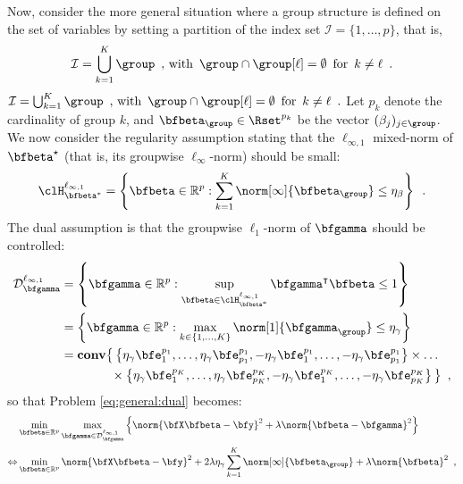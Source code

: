 Now, consider the more general situation where a group structure is defined on
the set of variables by setting a partition of the index set
$\mathcal{I}=\{1,\ldots,p\}$, that is,
\iflong
\begin{equation*}
  \mathcal{I}=\bigcup_{k=1}^K\group \enspace,\, \text{with}\enspace 
  \group \cap \group[\ell]=\emptyset \enspace
  \text{for}\enspace k\neq\ell \enspace.
\end{equation*}
\else
$
  \mathcal{I}=\bigcup_{k=1}^K\group \enspace,\, \text{with}\enspace 
  \group \cap \group[\ell]=\emptyset \enspace
  \text{for}\enspace k\neq\ell \enspace.
$
\fi
Let $p_k$ denote the cardinality of group $k$, and $\bfbeta_{\group} \in
\Rset^{p_k}$ be the vector $(\beta_j)_{j\in \group}$.
%
\iflong
We now consider the regularity assumption stating that the $\ell_{\infty,1}$
mixed-norm of $\bfbeta^\star$ (that is, its groupwise $\ell_\infty$-norm) should
be small:
\begin{equation*}
  \clH^{\ell_{\infty,1}}_{\bfbeta^*} = \left\{ 
    \bfbeta \in \mathbb{R}^p :\sum_{k=1}^K \norm[\infty]{\bfbeta_{\group}} \leq \eta_\beta
  \right\}
  \enspace.
\end{equation*}
%
The dual assumption is that the groupwise $\ell_1$-norm of $\bfgamma$ should be
controlled:
%
\begin{align*}
  \mathcal{D}^{\ell_{\infty,1}}_{\bfgamma} & = \left\{ \bfgamma \in \mathbb{R}^p :
\sup_{\bfbeta\in\clH^{\ell_{\infty,1}}_{\bfbeta^*}} \bfgamma^\intercal\bfbeta \leq 1 \right\} \\
    & = \left\{ \bfgamma \in \mathbb{R}^p : \max_{k\in\{1,...,K\}}  \norm[1]{\bfgamma_{\group}} \leq \eta_\gamma \right\} \\
    & = \mathbf{conv} \big\{ 
                        \left\{\eta_\gamma\bfe^{p_1}_1, \ldots, \eta_\gamma\bfe^{p_1}_{p_1},-\eta_\gamma\bfe^{p_1}_1, \ldots, -\eta_\gamma\bfe^{p_1}_{p_1} \right\} 
                        \times \ldots \\
    & \hspace*{4em} \times 
                        \left\{\eta_\gamma\bfe^{p_K}_1, \ldots, \eta_\gamma\bfe^{p_K}_{p_K},-\eta_\gamma\bfe^{p_K}_1, \ldots, -\eta_\gamma\bfe^{p_K}_{p_K} \right\} 
                      \big\}
  \enspace,
\end{align*}
so that Problem \eqref{eq:general:dual} becomes:
%
\begin{align*}
  & \min_{\bfbeta\in\mathbb{R}^p} \max_{\bfgamma \in \mathcal{D}^{\ell_{\infty,1}}_{\bfgamma}}
      \Big\{ \norm{\bfX \bfbeta - \bfy}^2 + \lambda \norm{\bfbeta - \bfgamma}^2 \Big\} \\
  \Leftrightarrow
    & \min_{\bfbeta\in\mathbb{R}^p}
      \norm{\bfX \bfbeta - \bfy}^2 + 2 \lambda \eta_\gamma \sum_{k=1}^K \norm[\infty]{\bfbeta_{\group}} + \lambda \norm{\bfbeta}^2 
  \enspace,
\end{align*}
